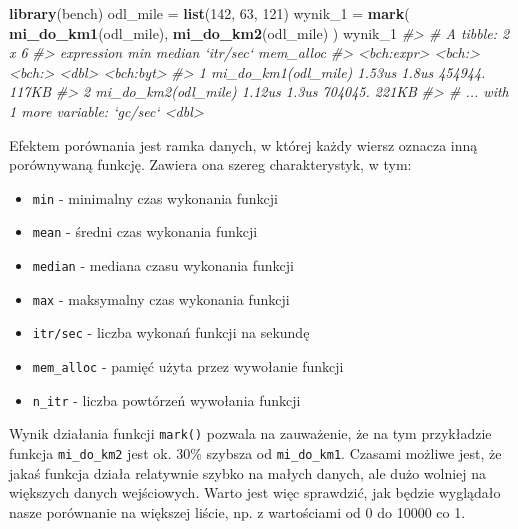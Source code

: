 \documentclass[paper=6in:9in,pagesize=pdftex,headinclude=on,footinclude=on,10pt]{scrbook}
\newenvironment{Shaded}{\begin{snugshade}}{\end{snugshade}}
\newcommand{\CommentTok}[1]{\textcolor[rgb]{0.56,0.35,0.01}{\textit{#1}}}
\newcommand{\DecValTok}[1]{\textcolor[rgb]{0.00,0.00,0.81}{#1}}
\newcommand{\KeywordTok}[1]{\textcolor[rgb]{0.13,0.29,0.53}{\textbf{#1}}}
\newcommand{\NormalTok}[1]{#1}
\newcommand{\StringTok}[1]{\textcolor[rgb]{0.31,0.60,0.02}{#1}}
\providecommand{\tightlist}{%
  \setlength{\itemsep}{0pt}\setlength{\parskip}{0pt}}
\begin{document}
\begin{Shaded}
\begin{Highlighting}[]
\KeywordTok{library}\NormalTok{(bench)}
\NormalTok{odl_mile =}\StringTok{ }\KeywordTok{list}\NormalTok{(}\DecValTok{142}\NormalTok{, }\DecValTok{63}\NormalTok{, }\DecValTok{121}\NormalTok{)}
\NormalTok{wynik_}\DecValTok{1}\NormalTok{ =}\StringTok{ }\KeywordTok{mark}\NormalTok{(}
  \KeywordTok{mi_do_km1}\NormalTok{(odl_mile),}
  \KeywordTok{mi_do_km2}\NormalTok{(odl_mile)}
\NormalTok{)}
\NormalTok{wynik_}\DecValTok{1}
\CommentTok{#> # A tibble: 2 x 6}
\CommentTok{#>   expression             min median `itr/sec` mem_alloc}
\CommentTok{#>   <bch:expr>          <bch:> <bch:>     <dbl> <bch:byt>}
\CommentTok{#> 1 mi_do_km1(odl_mile) 1.53us  1.8us   454944.     117KB}
\CommentTok{#> 2 mi_do_km2(odl_mile) 1.12us  1.3us   704045.     221KB}
\CommentTok{#> # ... with 1 more variable: `gc/sec` <dbl>}
\end{Highlighting}
\end{Shaded}

Efektem porównania jest ramka danych, w której każdy wiersz oznacza inną porównywaną funkcję.
Zawiera ona szereg charakterystyk, w tym:

\begin{itemize}
\tightlist
\item
  \texttt{min} - minimalny czas wykonania funkcji
\item
  \texttt{mean} - średni czas wykonania funkcji
\item
  \texttt{median} - mediana czasu wykonania funkcji
\item
  \texttt{max} - maksymalny czas wykonania funkcji
\item
  \texttt{itr/sec} - liczba wykonań funkcji na sekundę
\item
  \texttt{mem\_alloc} - pamięć użyta przez wywołanie funkcji
\item
  \texttt{n\_itr} - liczba powtórzeń wywołania funkcji
\end{itemize}

Wynik działania funkcji \texttt{mark()} pozwala na zauważenie, że na tym przykładzie funkcja \texttt{mi\_do\_km2} jest ok. 30\% szybsza od \texttt{mi\_do\_km1}.
Czasami możliwe jest, że jakaś funkcja działa relatywnie szybko na małych danych, ale dużo wolniej na większych danych wejściowych.
Warto jest więc sprawdzić, jak będzie wyglądało nasze porównanie na większej liście, np. z wartościami od 0 do 10000 co 1.
\end{document}
